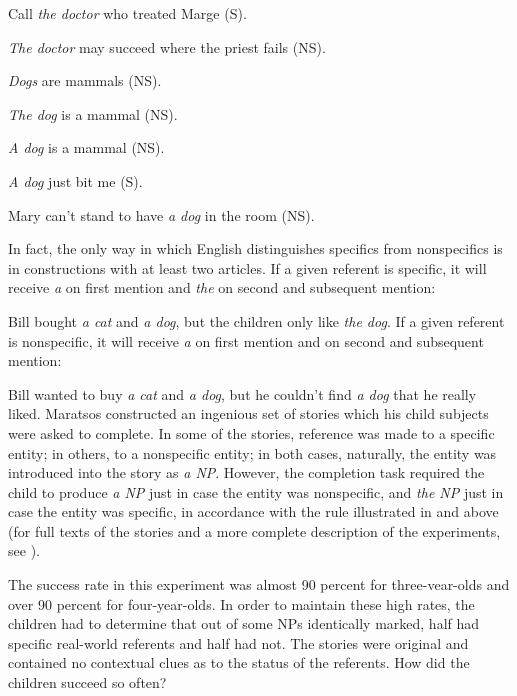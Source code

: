 \ea\label{ex:3:2}
 Call \textit{the doctor} who treated Marge (S).
\z

\ea\label{ex:3:3}
 \textit{The doctor} may succeed where the priest fails (NS).
\z

\ea\label{ex:3:4}
 \textit{Dogs} are mammals (NS).
\z

\ea\label{ex:3:5}
 \textit{The dog} is a mammal (NS).
\z

\ea\label{ex:3:6}
 \textit{A dog} is a mammal (NS).
\z

\ea\label{ex:3:7}
\textit{A dog} just bit me (S).
\z

\ea\label{ex:3:8}
 Mary can't stand to have \textit{a dog} in the room (NS). 
\z

In fact, the only way in which English distinguishes specifics from nonspecifics is in constructions with at least two articles. If a given referent is specific, it will receive \textit{a} on first mention and \textit{the} on second and subsequent mention:

\ea\label{ex:3:9}
 Bill bought \textit{a cat} and \textit{a dog}, but the children only like \textit{the dog}.
\glt
\z
If a given referent is nonspecific, it will receive \textit{a} on first mention and on second and subsequent mention:

\ea\label{ex:3:10}
 Bill wanted to buy \textit{a cat} and \textit{a dog}, but he couldn't find \textit{a dog} that he really liked.
\z
Maratsos constructed an ingenious set of stories which his child subjects were asked to complete. In some of the stories, reference was made to a specific entity; in others, to a nonspecific entity; in both cases, naturally, the entity was introduced into the story as \textit{a NP}. However, the completion task required the child to produce \textit{a NP} just in case the entity was nonspecific, and \textit{the NP} just in case the entity was specific, in accordance with the rule illustrated in  and  above (for full texts of the stories and a more complete description of the experiments, see \citealt{Maratsos1976}).

The success rate in this experiment was almost 90 percent for three-vear-olds and over 90 percent for four-year-olds. In order to maintain these high rates, the children had to determine that out of some NPs identically marked, half had specific real-world referents and half had not. The stories were original and contained no contextual clues as to the status of the referents. How did the children succeed so often?

